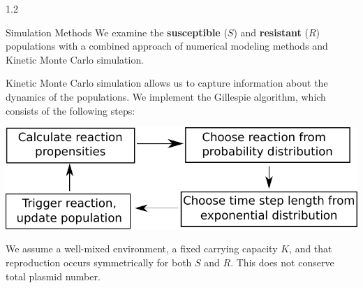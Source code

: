 \documentclass[final]{beamer}
\newlength{\sepwid}
\newlength{\onecolwid}
\newlength{\figwid}
\begin{document}
\begin{frame}[t]
\begin{block}
\begin{columns}[t]
\begin{column}{1.2\onecolwid}
  \begin{alertblock}{Simulation Methods}
    We examine the \textbf{susceptible} ($S$) and \textbf{resistant} ($R$) populations
    with a combined approach of numerical modeling methods and Kinetic Monte
    Carlo simulation.

    \quad\quad Kinetic Monte Carlo simulation allows us to
    capture information about the dynamics of the populations. We implement the
    Gillespie algorithm, which consists of the following steps:
    \begin{center}
    \includegraphics[width=\figwid]{../dev/graphics/poster/gillespie.pdf}
    \end{center}

    \quad\quad We assume a well-mixed environment, a fixed carrying capacity $K$, and
    that reproduction occurs symmetrically for both $S$ and $R$. This does not conserve total
    plasmid number.
  \end{alertblock}
\end{column}
\end{columns} %
\end{block}



\end{frame}
\end{document}
